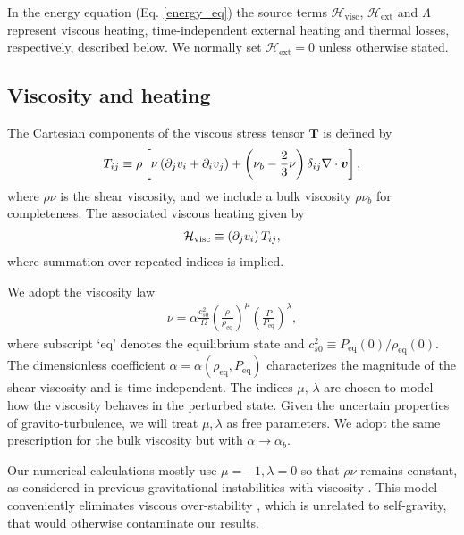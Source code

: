 In the energy equation (Eq. \ref{energy_eq}) the source terms 
$\mathcal{H}_\mathrm{visc}$, $\mathcal{H}_\mathrm{ext}$ and $\Lambda$
represent viscous heating, time-independent external heating and
thermal losses, respectively, described below. We normally set
$\mathcal{H}_\mathrm{ext}=0$ unless otherwise stated. 

\subsection{Viscosity and heating}\label{visc_model}
The Cartesian components of the viscous stress tensor $\bm{T}$ is
defined by 
\begin{align}
  T_{ij} \equiv \rho \left[\nu \left(\partial_j v_i + \partial_i v_j\right) +
    \left(\nu_b-\frac{2}{3}\nu\right)\delta_{ij}\nabla\cdot\bm{v}\right], 
\end{align}
where $\rho\nu$ is the shear viscosity, and we include a bulk
viscosity $\rho\nu_b$ for completeness.  
The associated viscous heating given by
\begin{align}
  \mathcal{H}_\mathrm{visc} \equiv \left(\partial_jv_i\right)T_{ij}, 
\end{align}
where summation over repeated indices is implied. 

We adopt the viscosity law  
\begin{align}
  \nu = \alpha
  \frac{c_{s0}^2}{\Omega}\left(\frac{\rho}{\rho_\mathrm{eq}}\right)^\mu\left(\frac{P}{P_\mathrm{eq}}\right)^\lambda,            
\end{align}
where subscript `eq' denotes the equilibrium state and  
$c_{s0}^2\equiv P_\mathrm{eq}(0)/\rho_\mathrm{eq}(0)$. 
The dimensionless coefficient
$\alpha=\alpha(\rho_\mathrm{eq},P_\mathrm{eq})$ characterizes the
magnitude of the shear viscosity and is time-independent.  
The indices $\mu,\,\lambda$ are chosen to model how 
the viscosity behaves in the perturbed state. Given the uncertain
properties of gravito-turbulence, we will treat $\mu,\lambda$ as free
parameters. We adopt the same prescription for the bulk viscosity but
with $\alpha\to\alpha_b$.   

Our numerical calculations mostly use $\mu=-1,\lambda=0$ so
that $\rho\nu$ remains constant, as considered
in previous gravitational instabilities with 
viscosity \citep{hunter83,gammie96}. 
This model conveniently eliminates  
viscous over-stability \citep{schmit95,latter06}, which is unrelated
to self-gravity, that would otherwise contaminate our results. 

